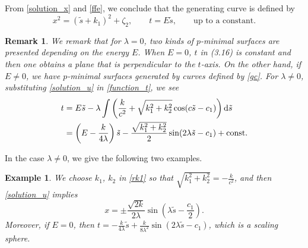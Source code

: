 \documentclass[10pt,a4paper]{amsart}
\numberwithin{equation}{section}
\newtheorem{Example}[Theorem]{Example}
\newtheorem{Remark}[Theorem]{Remark} }
\begin{document}
From \eqref{solution_x} and \eqref{ffe}, we conclude that the generating curve is defined by
\begin{equation}\label{gc}
x^{2}=(\tilde{s}+k_1)^{2}+\zeta_{2},\qquad
t=E\tilde{s},\qquad \textrm{up to a constant}.
\end{equation}


\begin{Remark} We remark that for $\lambda=0$, two kinds of $p$-minimal surfaces are presented depending on the energy $E$. When $E=0$, $t$ in (3.16) is constant and then one obtains a plane that is perpendicular to the $t$-axis. On the other hand, if $E\neq 0$, we have $p$-minimal surfaces generated by curves defined by \eqref{gc}. For $\lambda \neq 0$, substituting \eqref{solution_u} in \eqref{function_t}, we
see
\begin{align*}
t&=E\tilde s-\lambda \int \left(\frac{k}{c^2}+\sqrt{k_1^2+k_2^2}\cos(c\tilde
s-c_1)\right){\rm d}\tilde s \\
&=\left(E-\frac{k}{4\lambda}\right)\tilde s-\frac{\sqrt{k_1^2+k_2^2}}{2}\sin(2\lambda
\tilde s-c_1)+\text{\rm const}.
\end{align*}
\end{Remark}
In the case $\lambda \neq 0$, we give the following two examples.


\begin{Example}
We choose $k_1$, $k_2$ in \eqref{rk1} so that $\sqrt{k_1^2+k_2^2}=-\frac{k}{c^2}$, and then
\eqref{solution_u} implies
\begin{equation*}
x=\pm \frac{\sqrt{2k}}{2\lambda} \sin\left(\lambda \tilde s-\frac{c_1}{2}\right).
\end{equation*}
Moreover, if $E=0$, then $t=-\frac{k}{4\lambda}\tilde s+\frac{k}{8\lambda^2}
\sin(2\lambda \tilde s-c_1)$, which is a scaling sphere.
\end{Example}
\end{document}
